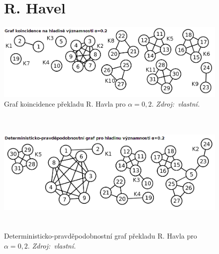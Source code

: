 \documentclass[dp.tex]{subfiles}
\begin{document}
\begin{figure}[h]
\section*{R. Havel}
	\centering
	\includegraphics[max width=\textwidth,keepaspectratio=true]{imgs-99-priloha-d/s_k_20}
	\caption[Graf koincidence překladu R. Havla pro $\alpha = 0{,}2$]
            {Graf koincidence překladu R. Havla pro $\alpha = 0{,}2$. \textit{Zdroj:~vlastní.}}
	\label{fig:s_k_20}
\end{figure}
\begin{figure}[h]
	\includegraphics[max width=\textwidth,height=6cm, keepaspectratio=true]{imgs-99-priloha-d/s_d_20}
	\caption[Deterministicko-pravděpodobnostní graf překladu R. Havla pro $\alpha = 0{,}2$]
            {Deterministicko-pravděpodobnostní graf překladu R. Havla pro $\alpha = 0{,}2$. \textit{Zdroj:~vlastní.}}
	\label{fig:s_d_20}
\end{figure}
\end{document}
